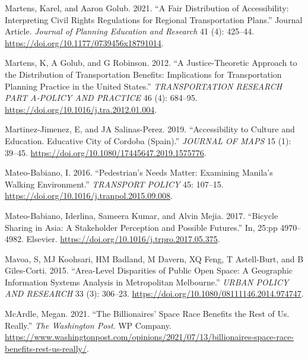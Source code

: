 \documentclass[12pt, oneside]{report}
\newlength{\cslhangindent}
\newlength{\cslentryspacingunit} %
\newenvironment{CSLReferences}[2] %
 {%
  \setlength{\parindent}{0pt}
  \ifodd #1
  \let\oldpar\par
  \def\par{\hangindent=\cslhangindent\oldpar}
  \fi
  \setlength{\parskip}{#2\cslentryspacingunit}
 }%
 {}
\begin{document}
\begin{CSLReferences}{1}{0}
\leavevmode{}%
Martens, Karel, and Aaron Golub. 2021. {``A Fair Distribution of
Accessibility: Interpreting Civil Rights Regulations for Regional
Transportation Plans.''} Journal Article. \emph{Journal of Planning
Education and Research} 41 (4): 425--44.
\url{https://doi.org/10.1177/0739456x18791014}.

\leavevmode{}%
Martens, K, A Golub, and G Robinson. 2012. {``A Justice-Theoretic
Approach to the Distribution of Transportation Benefits: {Implications}
for Transportation Planning Practice in the {United States}.''}
\emph{TRANSPORTATION RESEARCH PART A-POLICY AND PRACTICE} 46 (4):
684--95. \url{https://doi.org/10.1016/j.tra.2012.01.004}.

\leavevmode{}%
Martinez-Jimenez, E, and JA Salinas-Perez. 2019. {``Accessibility to
Culture and Education. {Educative} City of {Cordoba} ({Spain}).''}
\emph{JOURNAL OF MAPS} 15 (1): 39--45.
\url{https://doi.org/10.1080/17445647.2019.1575776}.

\leavevmode{}%
Mateo-Babiano, I. 2016. {``Pedestrian's Needs Matter: {Examining
Manila}'s Walking Environment.''} \emph{TRANSPORT POLICY} 45: 107--15.
\url{https://doi.org/10.1016/j.tranpol.2015.09.008}.

\leavevmode{}%
Mateo-Babiano, Iderlina, Sameera Kumar, and Alvin Mejia. 2017.
{``Bicycle {Sharing} in {Asia}: {A Stakeholder Perception} and {Possible
Futures}.''} In, 25:pp 4970--4982. {Elsevier}.
\url{https://doi.org/10.1016/j.trpro.2017.05.375}.

\leavevmode{}%
Mavoa, S, MJ Koohsari, HM Badland, M Davern, XQ Feng, T Astell-Burt, and
B Giles-Corti. 2015. {``Area-{Level Disparities} of {Public Open Space}:
{A Geographic Information Systems Analysis} in {Metropolitan
Melbourne}.''} \emph{URBAN POLICY AND RESEARCH} 33 (3): 306--23.
\url{https://doi.org/10.1080/08111146.2014.974747}.

\leavevmode{}%
McArdle, Megan. 2021. {``{The} Billionaires' Space Race Benefits the
Rest of Us. {R}eally.''} \emph{The Washington Post}. WP Company.
\url{https://www.washingtonpost.com/opinions/2021/07/13/billionaires-space-race-benefits-rest-us-really/}.


\end{CSLReferences}
\end{document}
